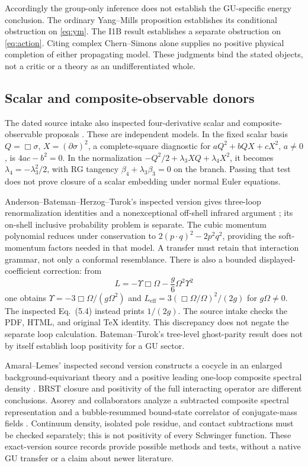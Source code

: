 Accordingly the group-only inference does not establish the GU-specific
energy conclusion. The ordinary Yang--Mills proposition establishes its
conditional obstruction on \eqref{eq:ym}. The I1B result establishes a
separate obstruction on \eqref{eq:action}. Citing complex Chern--Simons
alone supplies no positive physical completion of either propagating
model. These judgments bind the stated objects, not a critic or a theory
as an undifferentiated whole.

\subsection{Scalar and composite-observable donors}
The dated source intake also inspected four-derivative scalar and
composite-observable proposals \cite{ScalarIntake}. These are independent
models. In the fixed scalar basis $Q=\Box\sigma$, $X=(\partial\sigma)^2$,
a complete-square diagnostic for $aQ^2+bQX+cX^2$, $a\ne0$, is
$4ac-b^2=0$. In the normalization
$-Q^2/2+\lambda_3XQ+\lambda_4X^2$, it becomes
$\lambda_4=-\lambda_3^2/2$, with RG tangency
$\beta_4+\lambda_3\beta_3=0$ on the branch.
Passing that test does not prove closure of a scalar embedding under
normal Euler equations.

Anderson--Bateman--Herzog--Turok's inspected version gives three-loop
renormalization identities and a nonexceptional off-shell infrared
argument \cite{ABHT}; its on-shell inclusive probability problem is
separate. The cubic momentum polynomial reduces under conservation to
$2(p\cdot q)^2-2p^2q^2$, providing the soft-momentum factors needed in
that model. A transfer must retain that interaction grammar, not only
a conformal resemblance.
There is also a bounded displayed-coefficient correction: from
\[
 L=-\Upsilon\Box\Omega-\frac g6\Omega^2\Upsilon^2
\]
one obtains $\Upsilon=-3\Box\Omega/(g\Omega^2)$ and
$L_{\mathrm{eff}}=3(\Box\Omega/\Omega)^2/(2g)$ for
$g\Omega\ne0$. The inspected Eq.~(5.4) instead prints $1/(2g)$.
The source intake checks the PDF, HTML, and original TeX identity.
This discrepancy does not negate the separate loop calculation.
Bateman--Turok's tree-level ghost-parity result \cite{BT} does not
by itself establish loop positivity for a GU sector.

Amaral--Lemes' inspected second version constructs a cocycle in an
enlarged background-equivariant theory and a positive leading one-loop
composite spectral density \cite{AL}. BRST closure and positivity of the
full interacting operator are different conclusions.
Asorey and collaborators analyze a subtracted composite spectral
representation and a bubble-resummed bound-state correlator of
conjugate-mass fields \cite{AKPS}. Continuum density, isolated pole
residue, and contact subtractions must be checked separately; this is
not positivity of every Schwinger function. These exact-version source
records provide possible methods and tests, without a native GU transfer
or a claim about newer literature.


